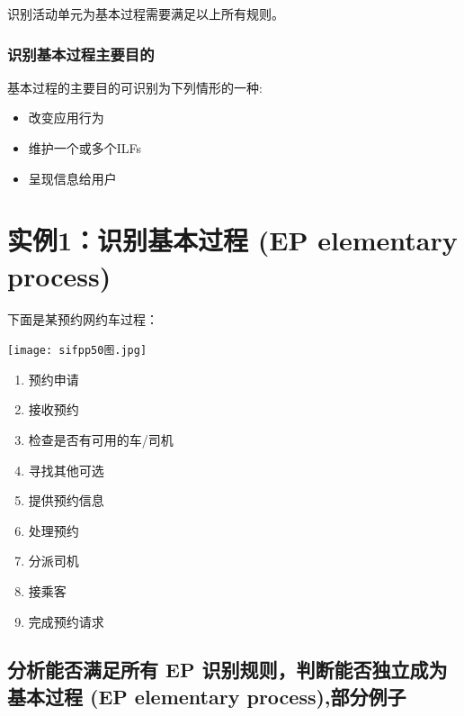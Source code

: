 识别活动单元为基本过程需要满足以上所有规则。\\

\hypertarget{ux8bc6ux522bux57faux672cux8fc7ux7a0bux4e3bux8981ux76eeux7684}{%
\subsubsection{识别基本过程主要目的}\label{ux8bc6ux522bux57faux672cux8fc7ux7a0bux4e3bux8981ux76eeux7684}}

基本过程的主要目的可识别为下列情形的一种:

\begin{itemize}
\tightlist
\item
  改变应用行为
\item
  维护一个或多个ILFs
\item
  呈现信息给用户
\end{itemize}

\hypertarget{ux5b9eux4f8b1ux8bc6ux522bux57faux672cux8fc7ux7a0b-ep-elementary-process}{%
\section{实例1：识别基本过程 (EP elementary
process)}\label{ux5b9eux4f8b1ux8bc6ux522bux57faux672cux8fc7ux7a0b-ep-elementary-process}}

下面是某预约网约车过程：


\texttt{[image: sifpp50图.jpg]}

\begin{enumerate}
\tightlist
\item
  预约申请
\item
  接收预约
\item
  检查是否有可用的车/司机
\item
  寻找其他可选
\item
  提供预约信息
\item
  处理预约
\item
  分派司机
\item
  接乘客
\item
  完成预约请求
\end{enumerate}

\hypertarget{ux5206ux6790ux80fdux5426ux6ee1ux8db3ux6240ux6709-ep-ux8bc6ux522bux89c4ux5219ux5224ux65adux80fdux5426ux72ecux7acbux6210ux4e3aux57faux672cux8fc7ux7a0b-ep-elementary-processux90e8ux5206ux4f8bux5b50}{%
\subsection{分析能否满足所有 EP 识别规则，判断能否独立成为基本过程 (EP
elementary
process),部分例子}\label{ux5206ux6790ux80fdux5426ux6ee1ux8db3ux6240ux6709-ep-ux8bc6ux522bux89c4ux5219ux5224ux65adux80fdux5426ux72ecux7acbux6210ux4e3aux57faux672cux8fc7ux7a0b-ep-elementary-processux90e8ux5206ux4f8bux5b50}}

